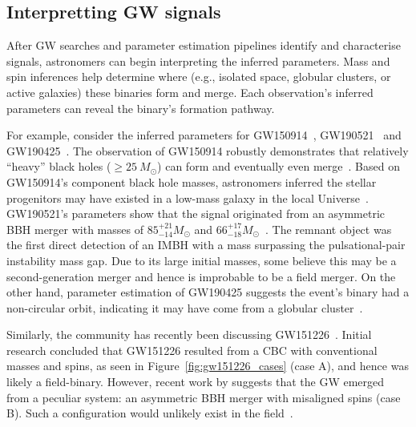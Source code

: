 \subsection{Interpretting GW signals}

After GW searches and parameter estimation pipelines identify and characterise signals, astronomers can begin interpreting the inferred parameters.
Mass and spin inferences help determine where (e.g., isolated space, globular clusters, or active galaxies) these binaries form and merge.
Each observation's inferred parameters can reveal the binary's formation pathway.

For example, consider the inferred parameters for GW150914~\cite{abbott2016observation}, GW190521~\cite{gw190521} and GW190425~\cite{gw190425}. 
The observation of GW150914 robustly demonstrates that relatively ``heavy'' black holes ($\geq25\ M_{\odot}$) can form and eventually even merge~\cite{gw150914_asto_implications}.
Based on GW150914's component black hole masses, astronomers inferred the stellar progenitors may have existed in a low-mass galaxy in the local Universe~\cite{gw150914_asto_implications}. 
GW190521's parameters show that the signal originated from an asymmetric BBH merger with masses of $85^{+21}_{-14}M_{\odot}$ and $66^{+17}_{-18}M_{\odot}$~\cite{gw190521}.
The remnant object was the first direct detection of an IMBH with a mass surpassing the pulsational-pair instability mass gap.
Due to its large initial masses, some believe this may be a second-generation merger and hence is improbable to be a field merger. 
On the other hand,  parameter estimation of GW190425 suggests the event's binary had a non-circular orbit, indicating it may have come from a globular cluster~\cite{Romero-Shaw:2020:MNRAS}.

Similarly, the community has recently been discussing GW151226~\cite{Chia:2022:PhRvD, Mateu-Lucena:2021:arXiv, Nitz:2021:ApJ}. 
Initial research concluded that GW151226 resulted from a CBC with conventional masses and spins, as seen in Figure~\ref{fig:gw151226_cases} (case A), and hence was likely a field-binary.
However, recent work by \citet{Chia:2022:PhRvD} suggests that the GW emerged from a peculiar system: an asymmetric BBH merger with misaligned  spins (case B). Such a configuration would unlikely exist in the field~\cite{Chia:2022:PhRvD}.


